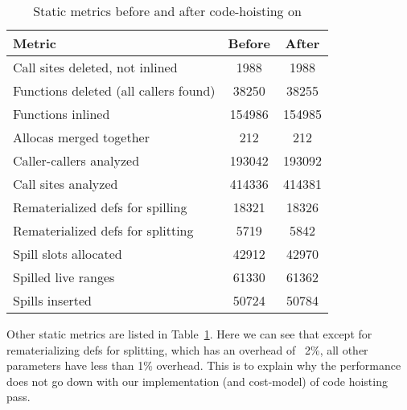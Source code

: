 \documentclass[acmlarge,review]{acmart}\settopmatter{printfolios=true}
\begin{document}
\begin{table}[h!]
  \begin{center}
    \begin{tabular}{|l|c|c|}
      \hline
      Metric               & Before & After              \\\hline
      Call sites deleted, not inlined             & 1988    & 1988   \\\hline
      Functions deleted (all callers found)       & 38250   & 38255  \\\hline
      Functions inlined                           & 154986  & 154985 \\\hline
      Allocas merged together                     & 212     & 212    \\\hline
      Caller-callers analyzed                     & 193042  & 193092 \\\hline
      Call sites analyzed                         & 414336  & 414381 \\\hline
      Rematerialized defs for spilling            & 18321   & 18326  \\\hline
      Rematerialized defs for splitting           & 5719    & 5842   \\\hline
      Spill slots allocated                       & 42912   & 42970  \\\hline
      Spilled live ranges                         & 61330   & 61362  \\\hline
      Spills inserted                             & 50724   & 50784  \\\hline
\end{tabular}
  \end{center}
  \caption{Static metrics before and after code-hoisting on \LLVMTestSuite{}}
  \label{tab:static-results}
\end{table}


Other static metrics are listed in Table~\ref{tab:static-results}. Here we can
see that except for rematerializing defs for splitting, which has an overhead of ~2\%, all
other parameters have less than 1\% overhead. This is to explain why the performance does not
go down with our implementation (and cost-model) of code hoisting pass.
\end{document}
